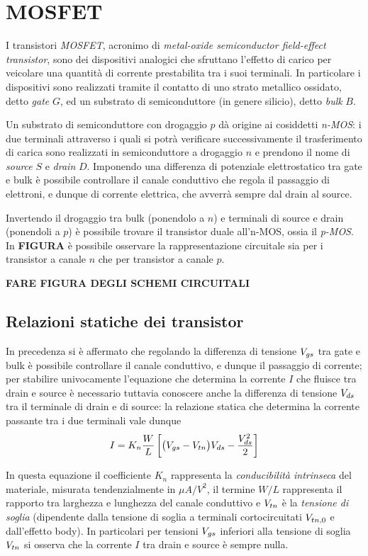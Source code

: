 \section{MOSFET}
	
	I transistori \textit{MOSFET}, acronimo di \textit{metal-oxide semiconductor field-effect transistor}, sono dei dispositivi analogici che sfruttano l'effetto di carico per veicolare una quantità di corrente prestabilita tra i suoi terminali. In particolare i dispositivi sono realizzati tramite il contatto di uno strato metallico ossidato, detto \textit{gate} $G$, ed un substrato di semiconduttore (in genere silicio), detto \textit{bulk} $B$.
	
	Un substrato di semiconduttore con drogaggio $p$ dà origine ai cosiddetti \textit{n-MOS}: i due terminali attraverso i quali si potrà verificare successivamente il trasferimento di carica sono realizzati in semiconduttore a drogaggio $n$ e prendono il nome di \textit{source} $S$ e \textit{drain} $D$. Imponendo una differenza di potenziale elettrostatico tra gate e bulk è possibile controllare il canale conduttivo che regola il passaggio di elettroni, e dunque di corrente elettrica, che avverrà sempre dal drain al source.
	
	Invertendo il drogaggio tra bulk (ponendolo a $n$) e terminali di source e drain (ponendoli a $p$) è possibile trovare il transistor duale all'n-MOS, ossia il \textit{p-MOS}. In \textbf{FIGURA} è possibile osservare la rappresentazione circuitale sia per i transistor a canale $n$ che per transistor a canale $p$.
	
	\textbf{FARE FIGURA DEGLI SCHEMI CIRCUITALI}
	
\subsection{Relazioni statiche dei transistor}
	In precedenza si è affermato che regolando la differenza di tensione $V_{gs}$ tra gate e bulk è possibile controllare il canale conduttivo, e dunque il passaggio di corrente; per stabilire univocamente l'equazione che determina la corrente $I$ che fluisce tra drain e source è necessario tuttavia conoscere anche la differenza di tensione $V_{ds}$ tra il terminale di drain e di source: la relazione statica che determina la corrente passante tra i due terminali vale dunque
	\begin{equation}
		I = K_n \frac W L \left[ \big(V_{gs} - V_{tn}\big)V_{ds} - \frac {V_{ds}^2}2 \right]
	\end{equation}
	
	In questa equazione il coefficiente $K_n$ rappresenta la \textit{conducibilità intrinseca} del materiale, misurata tendenzialmente in $\mu A/V^2$, il termine $W/L$ rappresenta il rapporto tra larghezza e lunghezza del canale conduttivo e $V_{tn}$ è la \textit{tensione di soglia} (dipendente dalla tensione di soglia a terminali cortocircuitati $V_{tn,0}$ e dall'effetto body). In particolari per tensioni $V_{gs}$ inferiori alla tensione di soglia $V_{tn}$ si osserva che la corrente $I$ tra drain e source è sempre nulla.